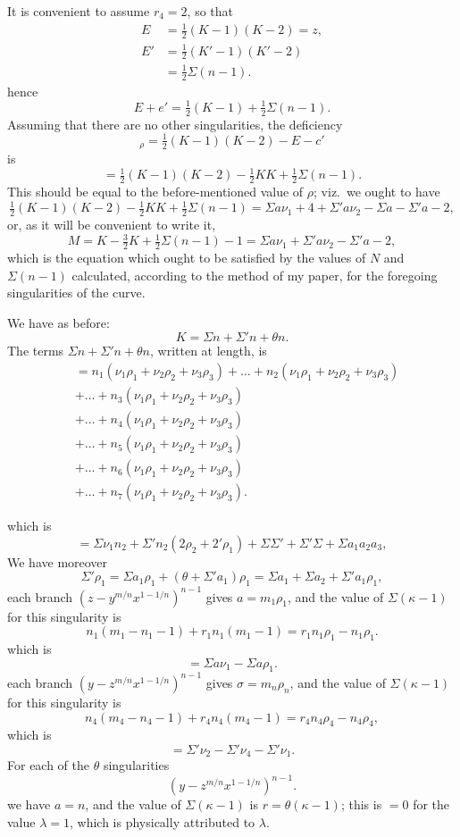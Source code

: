 \documentclass[12pt,a4paper,oneside]{book}
\theoremstyle{plain}
\theoremstyle{definition}
\theoremstyle{remark}
\begin{document}
It is convenient to assume $r_4=2$, so that
\begin{align*}
E&=\tfrac{1}{2}(K-1)(K-2)=z,\\
E'&=\tfrac{1}{2}(K'-1)(K'-2)\\
&=\tfrac{1}{2}\Sigma(n-1).
\end{align*}
hence
\[
E+e'=\tfrac{1}{2}(K-1)+\tfrac{1}{2}\Sigma(n-1).
\]
Assuming that there are no other singularities, the deficiency
\[
{}_\rho=\tfrac{1}{2}(K-1)(K-2)-E-c'
\]
is
\[
=\tfrac{1}{2}(K-1)(K-2)-\tfrac{1}{2}KK+\tfrac{1}{2}\Sigma(n-1).
\]
This should be equal to the before-mentioned value of $\rho$; viz.\ we ought to have
\[
\tfrac{1}{2}(K-1)(K-2)-\tfrac{1}{2}KK+\tfrac{1}{2}\Sigma(n-1)=\Sigma a\nu_1+4+\Sigma'a\nu_2-\Sigma a-\Sigma'a-2,
\]
or, as it will be convenient to write it,
\[
M=K-\tfrac{3}{2}K+\tfrac{1}{2}\Sigma(n-1)-1=\Sigma a\nu_1+\Sigma'a\nu_2-\Sigma'a-2,
\]
which is the equation which ought to be satisfied by the values of $N$ and $\Sigma (n-1)$ calculated, according to the method of my paper, for the foregoing singularities of the curve.

We have as before:
\[
K=\Sigma n+\Sigma'n+\theta n.
\]
The terms $\Sigma n+\Sigma'n+\theta n$, written at length, is
{\small
\begin{align*}
&=n_1(\nu_1\rho_1+\nu_2\rho_2+\nu_3\rho_3)+\dots+n_2(\nu_1\rho_1+\nu_2\rho_2+\nu_3\rho_3)\\
&+\dots+n_3(\nu_1\rho_1+\nu_2\rho_2+\nu_3\rho_3)\\
&+\dots+n_4(\nu_1\rho_1+\nu_2\rho_2+\nu_3\rho_3)\\
&+\dots+n_5(\nu_1\rho_1+\nu_2\rho_2+\nu_3\rho_3)\\
&+\dots+n_6(\nu_1\rho_1+\nu_2\rho_2+\nu_3\rho_3)\\
&+\dots+n_7(\nu_1\rho_1+\nu_2\rho_2+\nu_3\rho_3).
\end{align*}}

\newpage
which is
\[
=\Sigma\nu_1n_2+\Sigma'n_2(2\rho_2+2'\rho_1)+\Sigma\Sigma'+\Sigma'\Sigma+\Sigma a_1 a_2 a_3,
\]
We have moreover
\[
\Sigma'\rho_1=\Sigma a_1\rho_1+(\theta+\Sigma' a_1)\rho_1=\Sigma a_1+\Sigma a_2+\Sigma'a_1\rho_1,
\]
each branch $\left(z-y^{m/n}x^{1-1/n}\right)^{n-1}$ gives $a=m_1\rho_1$, and the value of $\Sigma(\kappa-1)$ for this singularity is
\[
n_1(m_1-n_1-1)+r_1n_1(m_1-1)=r_1n_1\rho_1-n_1\rho_1.
\]
which is
\[
=\Sigma a\nu_1-\Sigma a\rho_1.
\]
each branch $\left(y-z^{m/n}x^{1-1/n}\right)^{n-1}$ gives $\sigma=m_n\rho_n$, and the value of $\Sigma(\kappa-1)$ for this singularity is
\[
n_4(m_4-n_4-1)+r_4n_4(m_4-1)=r_4n_4\rho_4-n_4\rho_4,
\]
which is
\[
=\Sigma'\nu_2-\Sigma'\nu_4-\Sigma'\nu_1.
\]
For each of the $\theta$ singularities
\[
\left(y-z^{m/n}x^{1-1/n}\right)^{n-1}.
\]
we have $a=n$, and the value of $\Sigma(\kappa-1)$ is $r=\theta(\kappa-1)$; this is $=0$ for the value $\lambda=1$, which is physically attributed to $\lambda$.
\end{document}
